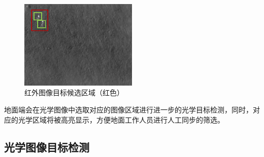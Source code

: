 \begin{figure}[h]
    \centering
    \includegraphics[width=5.61cm]{figures/红外图像目标候选区域.png}
    \caption{红外图像目标候选区域（红色）}\label{hotImageROI}
\end{figure}


地面端会在光学图像中选取对应的图像区域进行进一步的光学目标检测，同时，对应的光学区域将被高亮显示，方便地面工作人员进行人工同步的筛选。


\subsection{光学图像目标检测}

